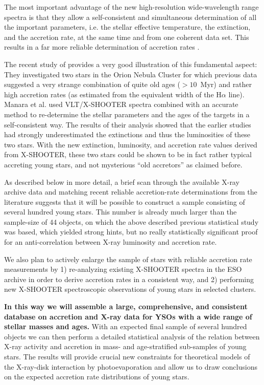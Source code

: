 \documentclass[10pt,fleqn,twoside]{article}
\begin{document}
The most important advantage of the new high-resolution wide-wavelength range
spectra is that they allow a self-consistent and simultaneous
determination of all the important parameters,  i.e. the
stellar effective temperature, the extinction, and the accretion rate, at the same time and
from one coherent data set.
This results in a far more reliable determination of accretion rates \citep[see][]{MT14}.



The recent study of \citet{Manara13} 
provides a very good illustration of this
fundamental aspect: They investigated two stars in the Orion Nebula Cluster
for which previous data suggested a very strange combination 
of quite old ages ($> 10$~Myr)
and rather high accretion rates (as estimated from the equivalent width
of the H$\alpha$ line).
Manara et al. used  VLT/X-SHOOTER spectra combined
 with an accurate method to re-determine the stellar parameters and the ages of the targets in a 
self-consistent way.
The results of their analysis showed that the earlier
studies had strongly underestimated the extinctions and thus the luminosities
of these two stars. With the new extinction, luminosity, and accretion rate
values derived from X-SHOOTER, these two stars could be shown to be in fact
rather typical accreting young  stars, and not mysterious ``old accretors'' as claimed
before.

\medskip


As described below in more detail, a brief scan through
the available X-ray archive data and matching recent
reliable accretion-rate determinations from the literature
suggests that
it will be possible to construct a sample consisting of several
hundred
young stars.
This number is already much larger than the sample-size of 44
objects, on which the above described previous statistical 
study was based, which yielded strong hints, but no really 
statistically significant proof for an 
anti-correlation between X-ray luminosity and accretion rate.


We also plan to actively enlarge the sample of stars with 
reliable accretion rate measurements by 
%
1) re-analyzing existing X-SHOOTER spectra in the ESO archive
in order to derive accretion rates in a consistent way, and
%
2) performing new X-SHOOTER spectroscopic 
observations of young stars in selected clusters.

{\bf
In this way we will assemble a large, comprehensive, and consistent
database on accretion and X-ray data for YSOs with a wide range of
stellar masses and ages.}
%
With an expected final sample of several hundred objects we can then perform a
 detailed statistical analysis
of the relation between X-ray activity and accretion in mass- and 
age-stratified sub-samples of young stars. 
The results will
provide crucial new
constraints for theoretical models of the X-ray-disk interaction 
by photoevaporation and allow us to
draw conclusions on the expected accretion rate distributions of 
young stars.
\end{document}
